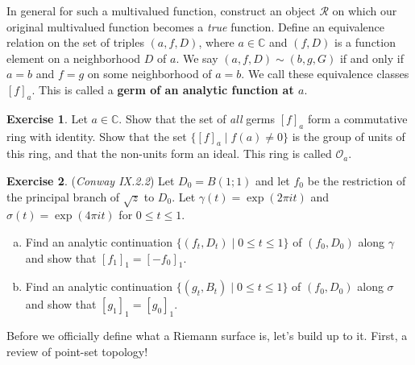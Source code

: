 \documentclass[12pt]{article}
\newcommand{\cx}{\mathbb{C}}
\newcommand{\ita}[1]{\textit{#1}}
\theoremstyle{definition}
\newtheorem{exercise}{Exercise}
\theoremstyle{remark}
\begin{document}
In general for such a multivalued function, construct an object $\mathcal{R}$ on which our original multivalued function becomes a \ita{true} function. Define an equivalence relation on the set of triples $(a,f,D)$, where $a\in\cx$ and $(f,D)$ is a function element on a neighborhood $D$ of $a$. We say $(a,f,D)\sim(b,g,G)$ if and only if $a=b$ and $f=g$ on some neighborhood of $a=b$. We call these equivalence classes $[f]_a$. This is called a \textbf{germ of an analytic function at $a$}.
\begin{exercise}
    Let $a\in\cx$. Show that the set of \ita{all} germs $[f]_a$ form a commutative ring with identity. Show that the set $\{[f]_a\mid f(a)\neq0\}$ is the group of units of this ring, and that the non-units form an ideal. This ring is called $\mathcal{O}_a$.
\end{exercise}
\begin{exercise}
    (\ita{Conway IX.2.2}) Let $D_0=B(1;1)$ and let $f_0$ be the restriction of the principal branch of $\sqrt{z}$ to $D_0$. Let $\gamma(t)=\exp(2\pi it)$ and $\sigma(t)=\exp(4\pi it)$ for $0\leq t\leq1$. 
    \begin{enumerate}[(a)]
        \item Find an analytic continuation $\{(f_t,D_t)\mid0\leq t\leq1\}$ of $(f_0,D_0)$ along $\gamma$ and show that $[f_1]_1=[-f_0]_1$.
        \item Find an analytic continuation $\{(g_t,B_t)\mid0\leq t\leq1\}$ of $(f_0,D_0)$ along $\sigma$ and show that $[g_1]_1=[g_0]_1$.
    \end{enumerate}
\end{exercise}
Before we officially define what a Riemann surface is, let's build up to it. First, a review of point-set topology!
\end{document}
